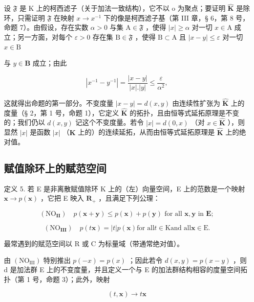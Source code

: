 设 \(\mathfrak{F}\) 是 K 上的柯西滤子（关于加法一致结构），它不以 o 为聚点；要证明 \(\hat{\mathbf{K}}\) 是除环，只需证明 \(\mathfrak{F}\) 在映射 \(x \to x^{-1}\) 下的像是柯西滤子基（第 III 章，§ 6，第 8 号，命题 7）。由假设，存在实数 \(\alpha > 0\) 与集 \(\mathrm{A} \in \mathfrak{F}\) ，使得 \(|x| \geqslant \alpha\) 对一切 \(x \in \mathrm{A}\) 成立；另一方面，对每个 \(\varepsilon > 0\) 存在集 \(\mathrm{B} \in \mathfrak{F}\) ，使得 \(\mathrm{B} \subset \mathrm{A}\) 且 \(|x - y| \leqslant \varepsilon\) 对一切 \(x \in \mathrm{B}\)

与 \(y\in \mathbf{B}\) 成立；由此

\[
\left| x ^ {- 1} - y ^ {- 1} \right| = \frac {\left| x - y \right|}{\left| x \right| . \left| y \right|} \leqslant \frac {\varepsilon}{\alpha^ {2}},
\]

这就得出命题的第一部分。不变度量 \(|x - y| = d(x, y)\) 由连续性扩张为 \(\hat{\mathbf{K}}\) 上的度量（§ 2，第 1 号，命题 1），它定义 \(\hat{\mathbf{K}}\) 的拓扑，且由恒等式延拓原理是不变的；我们仍以 \(d(x, y)\) 记这个不变度量。若令 \(|x| = d(0, x)\) （对 \(x \in \hat{\mathbf{K}}\) ），则显然 \(|x|\) 是函数 \(|x|\) （\(\mathbf{K}\) 上的）的连续延拓，从而由恒等式延拓原理是 \(\hat{\mathbf{K}}\) 上的绝对值。

\subsection{赋值除环上的赋范空间}

定义 5. 若 E 是非离散赋值除环 K 上的（左）向量空间，E 上的范数是一个映射 \(\mathbf{x} \to p(\mathbf{x})\) ，它把 E 映入 \(\mathbf{R}_+\) ，且满足下列公理：

\[
\left(\mathrm{NO} _ {\mathbf {I I}}\right) \quad p (\boldsymbol {x} + \boldsymbol {y}) \leqslant p (\boldsymbol {x}) + p (\boldsymbol {y}) \text {   for   all   } \boldsymbol {x}, \boldsymbol {y} \text {   in   } \mathbf {E};
\]

\[
\left(\mathrm{NO} _ {\mathbf {I I I}}\right) \quad p (t \boldsymbol {x}) = | t | p (\boldsymbol {x}) \text {for all} t \in \mathrm{K} \text {and all} \boldsymbol {x} \in \mathrm{E}.
\]

最常遇到的赋范空间以 R 或 C 为标量域（带通常绝对值）。

由 \((\mathrm{NO}_{\mathrm{III}})\) 特别推出 \(p(-x)=p(x)\) ；因此若令 \(d(x,y)=p(x-y)\) ，则 d 是加法群 E 上的不变度量，并且定义一个与 E 的加法群结构相容的度量空间拓扑（第 1 号，命题 3）；此外，映射

\[
(t, \boldsymbol {x}) \rightarrow t \boldsymbol {x}
\]

